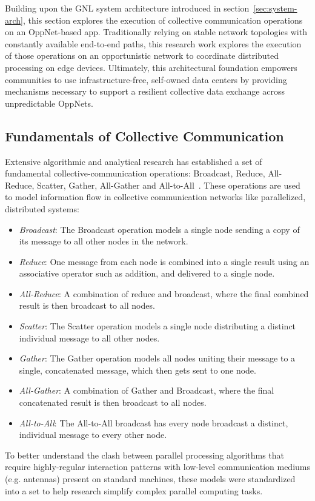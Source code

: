 Building upon the GNL system architecture introduced in section~\ref{sec:system-arch}, this section explores the execution of collective communication operations on an OppNet-based app. Traditionally relying on stable network topologies with constantly available end-to-end paths, this research work explores the execution of those operations on an opportunistic network to coordinate distributed processing on edge devices. Ultimately, this architectural foundation empowers communities to use infrastructure-free, self-owned data centers by providing mechanisms necessary to support a resilient collective data exchange across unpredictable OppNets.

\subsection{Fundamentals of Collective Communication}
Extensive algorithmic and analytical research has established a set of fundamental collective-communication operations: Broadcast, Reduce, All-Reduce, Scatter, Gather, All-Gather and All-to-All~\cite{Sanders2019}.
These operations are used to model information flow in collective communication networks like parallelized, distributed systems:\begin{itemize}
\item \emph{Broadcast}: The Broadcast operation models a single node sending a copy of its message to all other nodes in the network.
\item \emph{Reduce}: One message from each node is combined into a single result using an associative operator such as addition, and delivered to a single node.
\item \emph{All-Reduce}: A combination of reduce and broadcast, where the final combined result is then broadcast to all nodes.
\item \emph{Scatter}: The Scatter operation models a single node distributing a distinct individual message to all other nodes.
\item \emph{Gather}: The Gather operation models all nodes uniting their message to a single, concatenated message, which then gets sent to one node.
\item \emph{All-Gather}: A combination of Gather and Broadcast, where the final concatenated result is then broadcast to all nodes.
\item \emph{All-to-All}: The All-to-All broadcast has every node broadcast a distinct, individual message to every other node.
\end{itemize}
To better understand the clash between parallel processing algorithms that require highly-regular interaction patterns with low-level communication mediums (e.g. antennas) present on standard machines, these models were standardized into a set to help research simplify complex parallel computing tasks.
